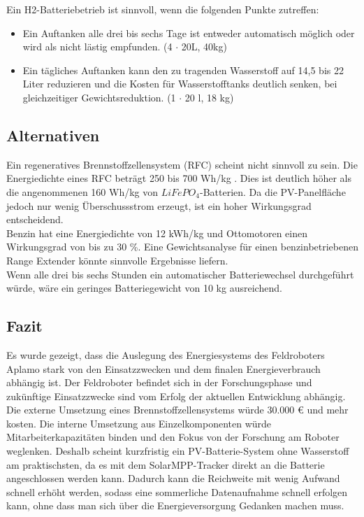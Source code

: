 Ein H2-Batteriebetrieb ist sinnvoll, wenn die folgenden Punkte zutreffen:
\begin{itemize}
    \item Ein Auftanken alle drei bis sechs Tage ist entweder automatisch möglich oder wird als nicht lästig empfunden. (4 $\cdot$ 20L, 40kg)
    \item Ein tägliches Auftanken kann den zu tragenden Wasserstoff auf 14,5 bis 22 Liter reduzieren und die Kosten für Wasserstofftanks deutlich senken, bei gleichzeitiger Gewichtsreduktion. (1 $\cdot$ 20 l, 18 kg)
\end{itemize}


\subsection{Alternativen}
Ein regeneratives Brennstoffzellensystem (RFC) scheint nicht sinnvoll zu sein. Die Energiedichte eines RFC beträgt 250 bis 700 Wh/kg \cite{NASA2002HeliosFactsheet}. Dies ist deutlich höher als die angenommenen 160 Wh/kg von $LiFePO_{4}$-Batterien. Da die PV-Panelfläche jedoch nur wenig Überschussstrom erzeugt, ist ein hoher Wirkungsgrad entscheidend. \\

Benzin hat eine Energiedichte von 12 kWh/kg und Ottomotoren einen Wirkungsgrad von bis zu 30 \%. Eine Gewichtsanalyse für einen benzinbetriebenen Range Extender könnte sinnvolle Ergebnisse liefern.\\

Wenn alle drei bis sechs Stunden ein automatischer Batteriewechsel durchgeführt würde, wäre ein geringes Batteriegewicht von 10 kg ausreichend. \\

\subsection{Fazit}
Es wurde gezeigt, dass die Auslegung des Energiesystems des Feldroboters Aplamo stark von den Einsatzzwecken und dem finalen Energieverbrauch abhängig ist. Der Feldroboter befindet sich in der Forschungsphase und zukünftige Einsatzzwecke sind vom Erfolg der aktuellen Entwicklung abhängig. Die externe Umsetzung eines Brennstoffzellensystems würde 30.000 € und mehr kosten. Die interne Umsetzung aus Einzelkomponenten würde Mitarbeiterkapazitäten binden und den Fokus von der Forschung am Roboter weglenken. Deshalb scheint kurzfristig ein PV-Batterie-System ohne Wasserstoff am praktischsten, da es mit dem SolarMPP-Tracker direkt an die Batterie angeschlossen werden kann. Dadurch kann die Reichweite mit wenig Aufwand schnell erhöht werden, sodass eine sommerliche Datenaufnahme schnell erfolgen kann, ohne dass man sich über die Energieversorgung Gedanken machen muss.


